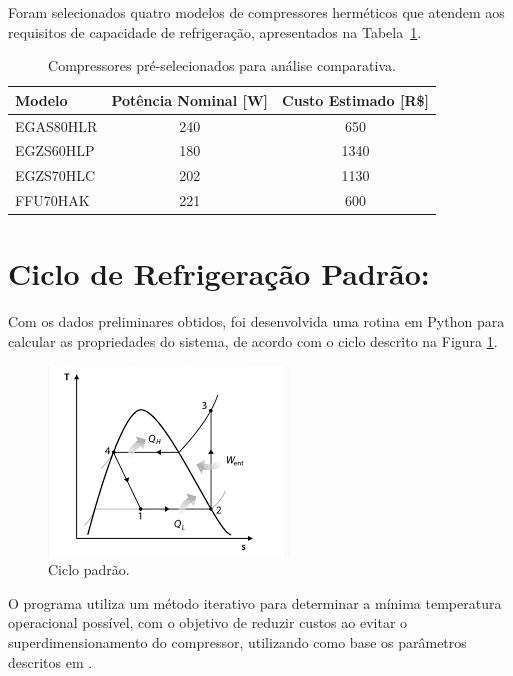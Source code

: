 Foram selecionados quatro modelos de compressores herméticos que atendem aos requisitos de capacidade de refrigeração, apresentados na Tabela~\ref{tab:compressores escolhidos}.

\begin{table}[ht]
\centering
\begin{tabular}{|l|c|c|}
\hline
\textbf{Modelo} & \textbf{Potência Nominal [W]} & \textbf{Custo Estimado [R\$]} \\ \hline
EGAS80HLR & 240 & 650 \\ \hline
EGZS60HLP & 180 & 1340 \\ \hline
EGZS70HLC & 202 & 1130 \\ \hline
FFU70HAK & 221 & 600 \\ \hline
\end{tabular}
\caption{Compressores pré-selecionados para análise comparativa.}
\label{tab:compressores escolhidos}
\end{table}

\newpage

\section{Ciclo de Refrigeração Padrão:}

Com os dados preliminares obtidos, foi desenvolvida uma rotina em Python para calcular as propriedades do sistema, de acordo com o ciclo descrito na Figura \ref{fig:ciclo padrão}. 

\begin{figure}[ht]
    \centering
    \includegraphics[width=0.6\linewidth]{Imagens/Desenvolvimento/Diagrama.png}
    \caption{Ciclo padrão.}
    \label{fig:ciclo padrão}
\end{figure}

\newpage

O programa utiliza um método iterativo para determinar a  mínima temperatura operacional possível, com o objetivo de reduzir custos ao evitar o superdimensionamento do compressor, utilizando como base os parâmetros descritos em \cite{paper_referencia}.

